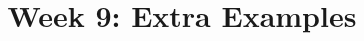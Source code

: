 \documentclass{ximera}
\title{Week 9: Extra Examples}
\begin{document}
  
\begin{abstract}  
\end{abstract}  
\maketitle 
\end{document}
